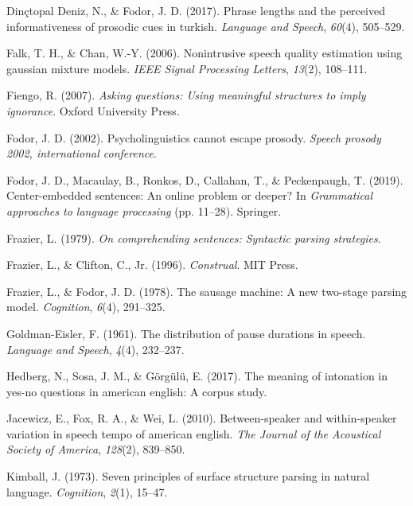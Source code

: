 \documentclass[12pt,oneside]{book}
\begin{document}
\leavevmode\hypertarget{ref-nazik}{}%
Dinçtopal Deniz, N., \& Fodor, J. D. (2017). Phrase lengths and the perceived informativeness of prosodic cues in turkish. \emph{Language and Speech}, \emph{60}(4), 505--529.

\leavevmode\hypertarget{ref-gmm1}{}%
Falk, T. H., \& Chan, W.-Y. (2006). Nonintrusive speech quality estimation using gaussian mixture models. \emph{IEEE Signal Processing Letters}, \emph{13}(2), 108--111.

\leavevmode\hypertarget{ref-fiengo}{}%
Fiengo, R. (2007). \emph{Asking questions: Using meaningful structures to imply ignorance}. Oxford University Press.

\leavevmode\hypertarget{ref-Fodor2002-io}{}%
Fodor, J. D. (2002). Psycholinguistics cannot escape prosody. \emph{Speech prosody 2002, international conference}.

\leavevmode\hypertarget{ref-fodor2019center}{}%
Fodor, J. D., Macaulay, B., Ronkos, D., Callahan, T., \& Peckenpaugh, T. (2019). Center-embedded sentences: An online problem or deeper? In \emph{Grammatical approaches to language processing} (pp. 11--28). Springer.

\leavevmode\hypertarget{ref-Frazier1979-pb}{}%
Frazier, L. (1979). \emph{On comprehending sentences: Syntactic parsing strategies}.

\leavevmode\hypertarget{ref-frazier1996construal}{}%
Frazier, L., \& Clifton, C., Jr. (1996). \emph{Construal}. MIT Press.

\leavevmode\hypertarget{ref-frazier1978sausage}{}%
Frazier, L., \& Fodor, J. D. (1978). The sausage machine: A new two-stage parsing model. \emph{Cognition}, \emph{6}(4), 291--325.

\leavevmode\hypertarget{ref-goldman1961-pa}{}%
Goldman-Eisler, F. (1961). The distribution of pause durations in speech. \emph{Language and Speech}, \emph{4}(4), 232--237.

\leavevmode\hypertarget{ref-Hedberg2017-er}{}%
Hedberg, N., Sosa, J. M., \& Görgülü, E. (2017). The meaning of intonation in yes-no questions in american english: A corpus study.

\leavevmode\hypertarget{ref-jacewicz2010-sr}{}%
Jacewicz, E., Fox, R. A., \& Wei, L. (2010). Between-speaker and within-speaker variation in speech tempo of american english. \emph{The Journal of the Acoustical Society of America}, \emph{128}(2), 839--850.

\leavevmode\hypertarget{ref-kimball1973seven}{}%
Kimball, J. (1973). Seven principles of surface structure parsing in natural language. \emph{Cognition}, \emph{2}(1), 15--47.
\end{document}
